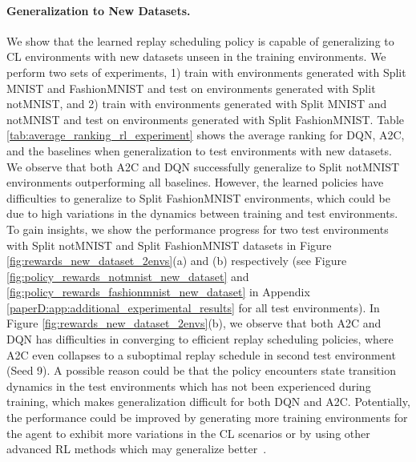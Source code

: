 \paragraph{Generalization to New Datasets.}
We show that the learned replay scheduling policy is capable of generalizing to CL environments with new datasets unseen in the training environments. We perform two sets of experiments, 1) train with environments generated with Split MNIST and FashionMNIST and test on environments generated with Split notMNIST, and 2) train with environments generated with Split MNIST and notMNIST and test on environments generated with Split FashionMNIST.
Table \ref{tab:average_ranking_rl_experiment} shows the average ranking for DQN, A2C, and the baselines when generalization to test environments with new datasets. We observe that both A2C and DQN successfully generalize to Split notMNIST environments outperforming all baselines. 
However, the learned policies have difficulties to generalize to Split FashionMNIST environments, which could be due to 
high variations in the dynamics between training and test environments.
To gain insights, we show the performance progress for two test environments with Split notMNIST and Split FashionMNIST datasets in Figure \ref{fig:rewards_new_dataset_2envs}(a) and (b) respectively (see Figure \ref{fig:policy_rewards_notmnist_new_dataset} and \ref{fig:policy_rewards_fashionmnist_new_dataset} in Appendix \ref{paperD:app:additional_experimental_results} for all test environments). 
In Figure \ref{fig:rewards_new_dataset_2envs}(b), we observe that both A2C and DQN has difficulties in converging to efficient replay scheduling policies, where A2C even collapses to a suboptimal replay schedule in second test environment (Seed 9).  
A possible reason could be that the policy encounters state transition dynamics in the test environments which has not been experienced during training, which makes generalization difficult for both DQN and A2C.
Potentially, the performance could be improved by generating more training environments for the agent to exhibit more variations in the CL scenarios or by using other advanced RL methods which may generalize better~.



